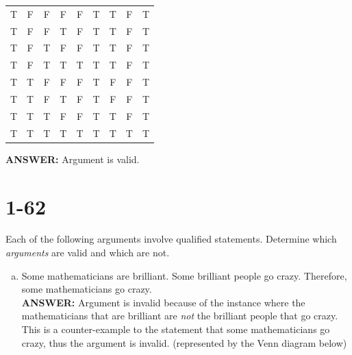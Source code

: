 \documentclass{article}
\begin{document}
\begin{enumerate}[a)]
\begin{center}
\begin{tabular}{ |c|c|c|c|c|c|c|c|c| }
                T & F & F & F & F & T & T & F & T \\
                T & F & F & T & F & T & T & F & T \\
                T & F & T & F & F & T & T & F & T \\
                T & F & T & T & T & T & T & F & T \\
                T & T & F & F & F & T & F & F & T \\
                T & T & F & T & F & T & F & F & T \\
                T & T & T & F & F & T & T & F & T \\
                T & T & T & T & T & T & T & T & T \\
                \hline
            \end{tabular}

        \end{center}
        \textbf{ANSWER:} Argument is valid.
\end{enumerate}

\newpage

\section{1-62}
Each of the following arguments involve qualified statements.  Determine which
\textit{arguments} are valid and which are not.
\begin{enumerate}[a)]
    \item Some mathematicians are brilliant.  Some brilliant people go crazy.
        Therefore, some mathematicians go crazy. \\
        \textbf{ANSWER:} Argument is invalid because of the instance where the
        mathematicians that are brilliant are \textit{not} the brilliant people
        that go crazy.  This is a counter-example to the statement that some
        mathematicians go crazy, thus the argument is invalid.
        (represented by the Venn diagram below)\\
        \begin{center}
        \end{center}
\end{enumerate}
\end{document}
